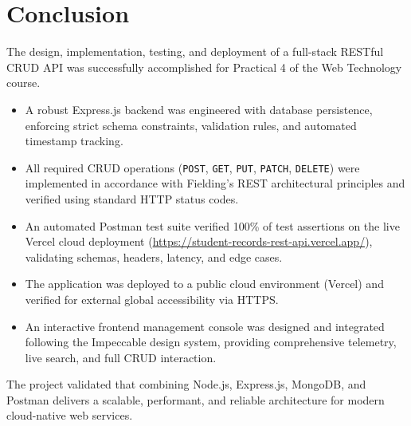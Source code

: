 \documentclass[11pt,a4paper]{article}
\begin{document}
\section{Conclusion}
The design, implementation, testing, and deployment of a full-stack RESTful CRUD API was successfully accomplished for Practical 4 of the Web Technology course. 
\begin{itemize}
    \item A robust Express.js backend was engineered with database persistence, enforcing strict schema constraints, validation rules, and automated timestamp tracking.
    \item All required CRUD operations (\texttt{POST}, \texttt{GET}, \texttt{PUT}, \texttt{PATCH}, \texttt{DELETE}) were implemented in accordance with Fielding's REST architectural principles and verified using standard HTTP status codes.
    \item An automated Postman test suite verified 100\% of test assertions on the live Vercel cloud deployment (\url{https://student-records-rest-api.vercel.app/}), validating schemas, headers, latency, and edge cases.
    \item The application was deployed to a public cloud environment (Vercel) and verified for external global accessibility via HTTPS.
    \item An interactive frontend management console was designed and integrated following the Impeccable design system, providing comprehensive telemetry, live search, and full CRUD interaction.
\end{itemize}
The project validated that combining Node.js, Express.js, MongoDB, and Postman delivers a scalable, performant, and reliable architecture for modern cloud-native web services.
\end{document}
